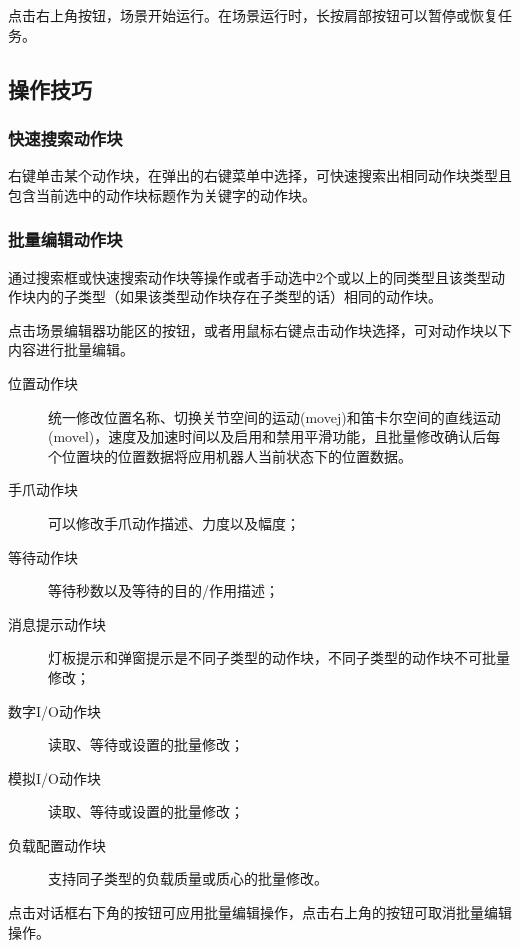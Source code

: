 点击右上角按钮，场景开始运行。在场景运行时，长按肩部按钮可以暂停或恢复任务。



\subsection{操作技巧}
\subsubsection{快速搜索动作块}
右键单击某个动作块，在弹出的右键菜单中选择，可快速搜索出相同动作块类型且包含当前选中的动作块标题作为关键字的动作块。
\subsubsection{批量编辑动作块}
\def\ttt{通过搜索框或快速搜索动作块等操作或者手动选中}
\ttt 2个或以上的同类型且该类型动作块内的子类型（如果该类型动作块存在子类型的话）相同的动作块。

点击场景编辑器功能区的按钮，或者用鼠标右键点击动作块选择，可对动作块以下内容进行批量编辑。

\begin{description}
\item [位置动作块] 统一修改位置名称、切换关节空间的运动(movej)和笛卡尔空间的直线运动(movel)，速度及加速时间以及启用和禁用平滑功能，且批量修改确认后每个位置块的位置数据将应用机器人当前状态下的位置数据。
\item [手爪动作块] 可以修改手爪动作描述、力度以及幅度；
\item [等待动作块] 等待秒数以及等待的目的/作用描述；
\item [消息提示动作块] 灯板提示和弹窗提示是不同子类型的动作块，不同子类型的动作块不可批量修改；
\item [数字I/O动作块] 读取、等待或设置的批量修改；
\item [模拟I/O动作块] 读取、等待或设置的批量修改；
\item [负载配置动作块] 支持同子类型的负载质量或质心的批量修改。
\end{description}

点击对话框右下角的按钮可应用批量编辑操作，点击右上角的\kbd{$\times$}按钮可取消批量编辑操作。

